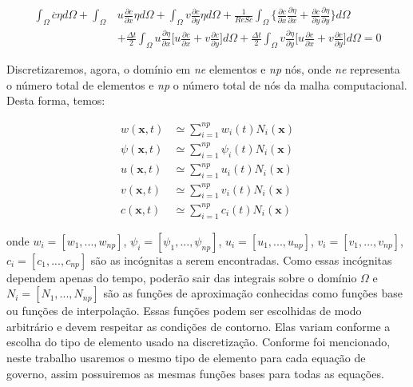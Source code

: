 \begin{equation} 
\begin{aligned} 
   \int_{\Omega} \overset{.}{c} \eta d\Omega 
 + \int_{\Omega} & u \frac{\partial c}{\partial x} \eta d\Omega 
 + \int_{\Omega} v \frac{\partial c}{\partial y} \eta d\Omega 
 + \frac{1}{\textit{ReSc}} \int_{\Omega} \Bigg\{ \frac{\partial c}{\partial x} \frac{\partial \eta}{\partial x} 
 + \frac{\partial c}{\partial y} \frac{\partial \eta}{\partial y} \Bigg\} d\Omega
 \\[5pt]
 & + \frac{\Delta t}{2} \int_{\Omega} u \frac{\partial \eta}{\partial x}
 \Bigg[
   u \frac{\partial c}{\partial x}
 + v \frac{\partial c}{\partial y}
 \Bigg] d\Omega
 + \frac{\Delta t}{2} \int_{\Omega} v \frac{\partial \eta}{\partial y}
 \Bigg[
   u \frac{\partial c}{\partial x}
 + v \frac{\partial c}{\partial y}
 \Bigg] d\Omega
 = 0
\end{aligned}
\end{equation}

\medskip
Discretizaremos, agora, o domínio em \textit{ne} elementos
e \textit{np} nós, onde \textit{ne} representa o número
total de elementos e \textit{np} o número total de nós
da malha computacional.
Desta forma, temos:

\begin{align}
 w(\textbf{x},t) & \simeq \sum\limits_{i=1}^{np} w_i(t) N_i(\textbf{x}) \\
 \psi(\textbf{x},t) & \simeq \sum\limits_{i=1}^{np} \psi_i(t) N_i(\textbf{x}) \\
 u(\textbf{x},t) & \simeq \sum\limits_{i=1}^{np} u_i(t) N_i(\textbf{x}) \\
 v(\textbf{x},t) & \simeq \sum\limits_{i=1}^{np} v_i(t) N_i(\textbf{x}) \\
 c(\textbf{x},t) & \simeq \sum\limits_{i=1}^{np} c_i(t) N_i(\textbf{x})
\end{align}

\noindent
onde 
$w_i = [w_1,...,w_{np}]$,
$\psi_i = [\psi_1,...,\psi_{np}]$,
$u_i = [u_1,...,u_{np}]$,
$v_i = [v_1,...,v_{np}]$,
$c_i = [c_1,...,c_{np}]$ 
são as incógnitas a serem encontradas.
Como essas incógnitas dependem apenas do tempo,
poderão sair das integrais sobre o domínio $\Omega$ e 
$N_i = [N_1,...,N_{np}]$
são as funções de aproximação conhecidas como
funções base ou funções de interpolação. Essas funções podem ser escolhidas
de modo arbitrário e devem respeitar as condições
de contorno. Elas variam conforme a escolha do
tipo de elemento usado na discretização.
Conforme foi mencionado, neste trabalho usaremos o mesmo tipo de
elemento para cada equação de governo, assim
possuiremos as mesmas funções bases para todas as
equações.


